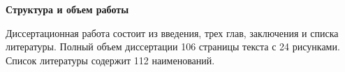 
\textbf{Структура и объем работы}

Диссертационная работа состоит из введения, трех глав, заключения и списка литературы. Полный объем диссертации 106 страницы текста с 24 рисунками. Список литературы содержит 112 наименований.